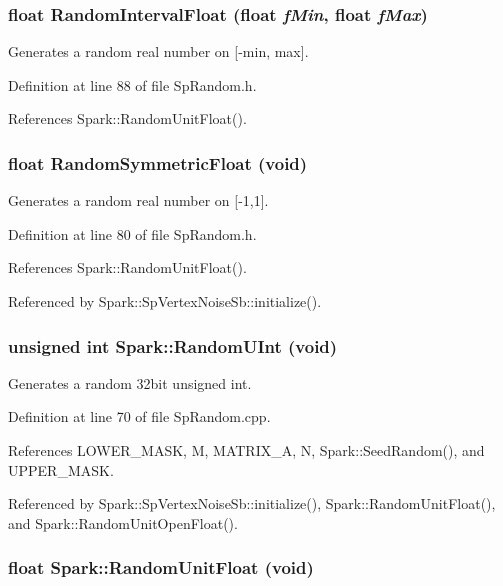 \subsubsection{\setlength{\rightskip}{0pt plus 5cm}float Random\-Interval\-Float (float {\em f\-Min}, float {\em f\-Max})\hspace{0.3cm}{\tt  [inline]}}\label{namespaceSpark_a117}


Generates a random real number on [-min, max]. 

Definition at line 88 of file Sp\-Random.h.

References Spark::Random\-Unit\-Float().
\subsubsection{\setlength{\rightskip}{0pt plus 5cm}float Random\-Symmetric\-Float (void)\hspace{0.3cm}{\tt  [inline]}}\label{namespaceSpark_a116}


Generates a random real number on [-1,1]. 

Definition at line 80 of file Sp\-Random.h.

References Spark::Random\-Unit\-Float().

Referenced by Spark::Sp\-Vertex\-Noise\-Sb::initialize().
\subsubsection{\setlength{\rightskip}{0pt plus 5cm}unsigned int Spark::Random\-UInt (void)}\label{namespaceSpark_a113}


Generates a random 32bit unsigned int. 

Definition at line 70 of file Sp\-Random.cpp.

References LOWER\_\-MASK, M, MATRIX\_\-A, N, Spark::Seed\-Random(), and UPPER\_\-MASK.

Referenced by Spark::Sp\-Vertex\-Noise\-Sb::initialize(), Spark::Random\-Unit\-Float(), and Spark::Random\-Unit\-Open\-Float().
\subsubsection{\setlength{\rightskip}{0pt plus 5cm}float Spark::Random\-Unit\-Float (void)}\label{namespaceSpark_a114}


